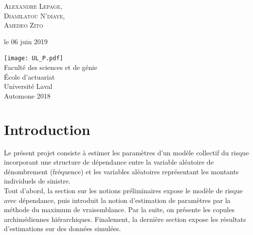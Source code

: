 \documentclass{article}
\begin{document}
\begin{titlepage}
		{\scshape\Large Alexandre Lepage, \\
			Diamilatou N'diaye, \\ Amedeo Zito \\} %
		
		\vspace*{5\baselineskip}
		
		le 06 juin 2019
		
		\vspace{0.5\baselineskip} %
		
		\vfill %
		
		
		\texttt{[image: UL\_P.pdf]}\\
		
		Faculté des sciences et de génie\\
		École d'actuariat\\
		Université Laval\\
		Automone 2018       
		
	\end{titlepage}
	
	\setcounter{page}{0}
	
	\newpage
	\strut %
	\newpage
	
	\tableofcontents	
	\renewcommand{\listfigurename}{Liste des illustrations}
	\listoffigures
	\listoftables
	\newpage
	
	\setcounter{page}{1}
	
	\section{Introduction}
	Le présent projet consiste à estimer les paramètres d'un modèle collectif du risque incorporant une structure de dépendance entre la variable aléatoire de dénombrement (fréquence) et les variables aléatoires représentant les montants individuels de sinistre.\\
	
	Tout d'abord, la section sur les notions préliminaires expose le modèle de risque avec dépendance, puis introduit la notion d'estimation de paramètres par la méthode du maximum de vraisemblance. Par la suite, on présente les copules archimédiennes hiérarchiques.
	Finalement, la dernière section expose les résultats d'estimations sur des données simulées.
	
\end{document}
